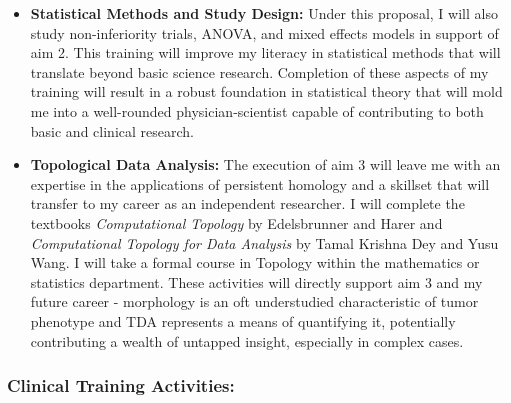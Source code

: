 \documentclass{NIHGrant}
\begin{document}
\begin{itemize}[leftmargin=*, nosep]
  \item \textbf{Statistical Methods and Study Design:} Under this proposal, I will also study non-inferiority trials, ANOVA, and mixed effects models in support of aim 2. This training will improve my literacy in statistical methods that will translate beyond basic science research. Completion of these aspects of my training will result in a robust foundation in statistical theory that will mold me into a well-rounded physician-scientist capable of contributing to both basic and clinical research.
  \item \textbf{Topological Data Analysis:} The execution of aim 3 will leave me with an expertise in the applications of persistent homology and a skillset that will transfer to my career as an independent researcher. I will complete the textbooks \textit{Computational Topology} by Edelsbrunner and Harer and \textit{Computational Topology for Data Analysis} by Tamal Krishna Dey and Yusu Wang. I will take a formal course in Topology within the mathematics or statistics department. These activities will directly support aim 3 and my future career - morphology is an oft understudied characteristic of tumor phenotype and TDA represents a means of quantifying it, potentially contributing a wealth of untapped insight, especially in complex cases.
\end{itemize}

\subsubsection*{Clinical Training Activities:}
\end{document}
